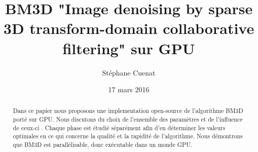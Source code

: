\documentclass[12pt,a4paper]{memoir} %
\begin{document}
\title{BM3D "Image denoising by sparse 3D transform-domain collaborative filtering" sur GPU}
\author{\small{Stéphane Cuenat}}
\date{\small{17 mars 2016}}
\maketitle

\begin{abstract}
Dans ce papier nous proposons une implementation open-source de l'algorithme BM3D porté sur GPU. Nous discutons du choix de l'ensemble des paramètres et de l'influence de ceux-ci . Chaque phase est étudié séparément afin d'en déterminer les valeurs optimales en ce qui concerne la qualité et la rapidité de l'algorithme. Nous démontrons que BM3D est parallélisable, donc exécutable dans un monde GPU.   

\end{abstract}

\newpage

\renewcommand{\contentsname}{Table des matières}
\renewcommand{\chaptername}{Chapitre}
\renewcommand{\bibname}{Bibliographie}
\renewcommand\listfigurename{Liste des figures}
\renewcommand\listtablename{Liste des tables}

\tableofcontents







\begin{appendix}
  \listoffigures
\end{appendix}



\end{document}
